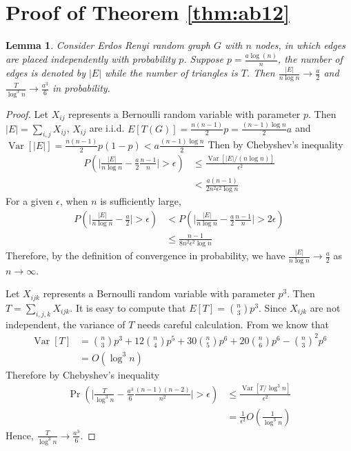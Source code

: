 \documentclass[journal]{IEEEtran}
\newtheorem{lemma}{Lemma}
\newcommand{\A}{\frac{a \log(n)}{n}}
\newcommand{\1}{\mathbbm{1}}
\DeclareMathOperator{\Var}{Var}
\begin{document}
\section*{Proof of Theorem \ref{thm:ab12}}
\begin{lemma}\label{lem:ER_tr_counting}
	Consider Erdos Renyi random graph $G$ with $n$ nodes, in which edges are placed independently with probability $p$. Suppose
	$p=\A$, the number of edges is denoted by $|E|$ while the number of triangles is $T$. Then
	$\frac{|E|}{n \log n} \to \frac{a}{2}$ and $\frac{T}{\log^3 n} \to \frac{a^3}{6}$ in probability.
\end{lemma}
\begin{proof}
		Let $X_{ij}$ represents a Bernoulli random variable with parameter $p$. Then $|E| = \sum_{i,j} X_{ij}$, $X_{ij}$ are i.i.d.
	$E[T(G)] = \frac{n(n-1)}{2}p = \frac{(n-1)\log n}{2}a$ and $\Var[|E|] = \frac{n(n-1)}{2} p(1-p) < a\frac{(n-1)\log n}{2}$
	Then by Chebyshev's inequality
	\begin{align*}
	P(\Big|\frac{|E|}{n \log n } - \frac{a}{2} \frac{n-1}{n}\Big| > \epsilon) & \leq
	\frac{\Var[|E| /(n \log n )]}{\epsilon^2} \\
	& < \frac{a(n-1)}{2n^2\epsilon^2\log n}
	\end{align*}
	For a given $\epsilon$, when $n$ is sufficiently large,
	\begin{align*}
	P(\Big|\frac{|E|}{n \log n } - \frac{a}{2} \Big| > \epsilon) & <
	P(\Big|\frac{|E|}{n \log n } - \frac{a}{2} \frac{n-1}{n}\Big| > 2\epsilon) \\
	& \leq \frac{n-1}{8n^2 \epsilon^2 \log n}
	\end{align*}
	Therefore, by the definition of convergence in probability, we have $\frac{|E|}{n \log n} \to \frac{a}{2}$ as $n\to \infty$.
	
	Let $X_{ijk}$ represents a Bernoulli random variable with parameter $p^3$.
	Then $T = \sum_{i,j,k} X_{ijk}$.
	It is easy to compute that $E[T] = \binom{n}{3}p^3$. Since $X_{ijk}$ are not independent, the variance of $T$ needs careful calculation.
	From \cite{holland1977method} we know that
	\begin{align*}
	\Var[T] & = \binom{n}{3} p^3 + 12 \binom{n}{4} p^5 + 30 \binom{n}{5} p^6 + 20 \binom{n}{6} p^6 - \binom{n}{3}^2 p^6 \\
	 & = O(\log^3 n)
	\end{align*}
	Therefore
	by Chebyshev's inequality
	\begin{align*}
	\Pr(\Big|\frac{T}{\log^3 n } - \frac{a^3}{6} \frac{(n-1)(n-2)}{n^2}\Big| > \epsilon) &\leq \frac{\Var[T /\log^3 n ]}{\epsilon^2} \\ 
	& = \frac{1}{\epsilon^2}O(\frac{1}{\log^3 n})
	\end{align*}
	Hence, $\frac{T}{\log^3 n} \to \frac{a^3}{6}$.
\end{proof}
\end{document}
